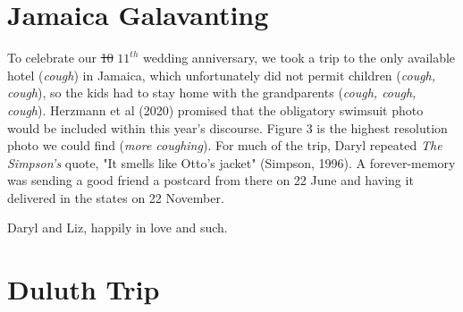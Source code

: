 \documentclass[letterpaper,11pt]{article}
\makeatletter
\newenvironment{figurehere}
  {\def\@captype{figure}}
  {}
\makeatother
\begin{document}
\begin{multicols}{2}
\section{Jamaica Galavanting}

To celebrate our \sout{10} ${11}^{th}$ wedding anniversary, we took a trip to the only
available hotel (\textit{cough}) in Jamaica, which unfortunately did not
permit children (\textit{cough, cough}), so the
kids had to stay home with the grandparents (\textit{cough, cough, cough}).
Herzmann et al (2020) promised that the obligatory swimsuit photo would be
included within this year's discourse.  Figure 3 is the highest
resolution photo we could find (\textit{more coughing}). For much of the trip,
Daryl repeated \textit{The Simpson's} quote, "It smells like
Otto's jacket" (Simpson, 1996). A forever-memory was sending a good friend a
postcard from there on 22 June and having it delivered in the states
on 22 November.

\begin{figurehere}
    \centering   
    \caption{Daryl and Liz, happily in love and such.}
\end{figurehere}

\section{Duluth Trip}


\end{multicols}
\end{document}
